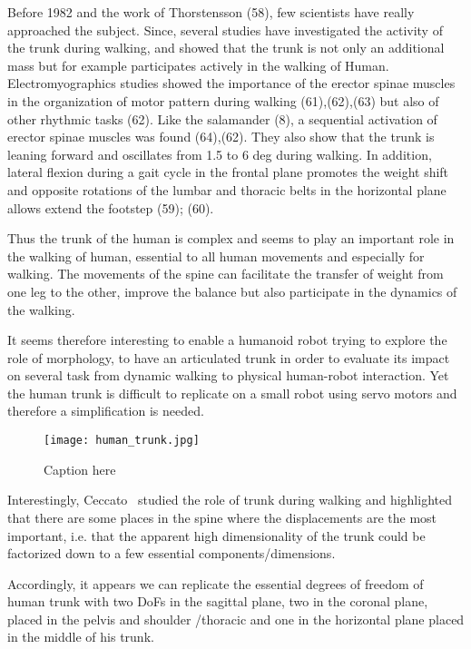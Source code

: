 Before 1982 and the work of Thorstensson (58), few scientists have really approached the subject. Since, several studies have investigated the activity of the trunk during walking, and showed that the trunk is not only an additional mass but for example participates actively in the walking of Human.
Electromyographics studies showed the importance of the erector spinae muscles in the organization of motor pattern during walking (61),(62),(63) but also of other rhythmic tasks (62). Like the salamander (8), a sequential activation of erector spinae muscles was found (64),(62).
They also show that the trunk is leaning forward and oscillates from 1.5 to 6 deg during walking. In addition, lateral flexion during a gait cycle in the frontal plane promotes the weight shift and opposite rotations of the lumbar and thoracic belts in the horizontal plane allows extend the footstep (59); (60).

Thus the trunk of the human is complex and seems to play an important role in the walking of human, essential to all human movements and especially for walking. The movements of the spine can facilitate the transfer of weight from one leg to the other, improve the balance but also participate in the dynamics of the walking.

It seems therefore interesting to enable a humanoid robot trying to explore the role of morphology, to have an articulated trunk in order to evaluate its impact on several task from dynamic walking to physical human-robot interaction. Yet the human trunk is difficult to replicate on a small robot using servo motors and therefore a simplification is needed.

\begin{figure}[tb]
    \begin{center}
        \texttt{[image: human\_trunk.jpg]}
    \end{center}
    \caption{Caption here}
    \label{fig:figure1}
\end{figure}

Interestingly, Ceccato~\cite{ceccatoPlos09} studied the role of trunk during walking and highlighted that there are some places in the spine where the displacements are the most important, i.e. that the apparent high dimensionality of the trunk could be factorized down to a few essential components/dimensions.

Accordingly, it appears we can replicate the essential degrees of freedom of human trunk with two DoFs in the sagittal plane, two in the coronal plane, placed in the pelvis and shoulder /thoracic and one in the horizontal plane placed in the middle of his trunk.

